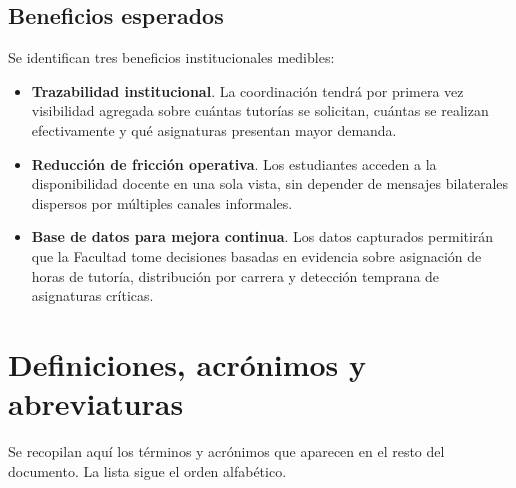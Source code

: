 \documentclass[11pt,a4paper,twoside]{report}
\begin{document}
\subsection{Beneficios esperados}

Se identifican tres beneficios institucionales medibles:

\begin{itemize}[leftmargin=1.5em,itemsep=2pt]
    \item \textbf{Trazabilidad institucional}. La coordinaci\'on tendr\'a por primera vez visibilidad agregada sobre cu\'antas tutor\'ias se solicitan, cu\'antas se realizan efectivamente y qu\'e asignaturas presentan mayor demanda.
    \item \textbf{Reducci\'on de fricci\'on operativa}. Los estudiantes acceden a la disponibilidad docente en una sola vista, sin depender de mensajes bilaterales dispersos por m\'ultiples canales informales.
    \item \textbf{Base de datos para mejora continua}. Los datos capturados permitir\'an que la Facultad tome decisiones basadas en evidencia sobre asignaci\'on de horas de tutor\'ia, distribuci\'on por carrera y detecci\'on temprana de asignaturas cr\'iticas.
\end{itemize}

\section{Definiciones, acr\'onimos y abreviaturas}
\label{sec:definiciones}

Se recopilan aqu\'i los t\'erminos y acr\'onimos que aparecen en el resto del documento. La lista sigue el orden alfab\'etico.
\end{document}

